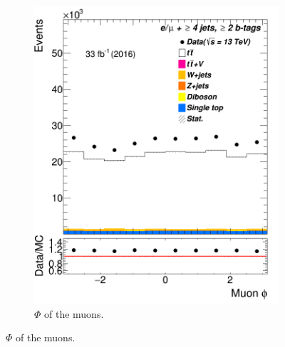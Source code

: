 \begin{figure}
\begin{subfigure}{0.25\textwidth}
		\includegraphics[width=\linewidth]{ControlPlots_emujets_2016_4incl_2incl/mu_phi_emujets_2016.png}
		\caption{$\Phi$ of the muons.} \label{fig:d2}
	\end{subfigure}



\end{figure}
